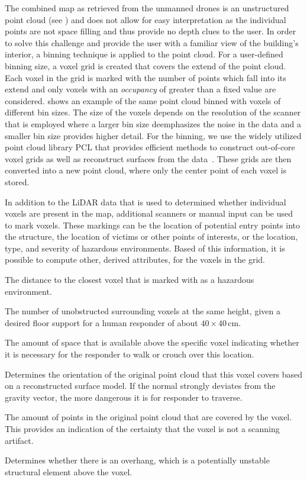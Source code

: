 The combined map as retrieved from the unmanned drones is an unstructured point cloud (see ) and does not allow for easy interpretation as the individual points are not space filling and thus provide no depth clues to the user.  In order to solve this challenge and provide the user with a familiar view of the building's interior, a binning technique is applied to the point cloud.  For a user-defined binning size, a voxel grid is created that covers the extend of the point cloud.  Each voxel in the grid is marked with the number of points which fall into its extend and only voxels with an \emph{occupancy} of greater than a fixed value are considered.   shows an example of the same point cloud binned with voxels of different bin sizes.  The size of the voxels depends on the resolution of the scanner that is employed where a larger bin size deemphasizes the noise in the data and a smaller bin size provides higher detail.  For the binning, we use the widely utilized point cloud library PCL that provides efficient methods to construct out-of-core voxel grids as well as reconstruct surfaces from the data~\cite{rusu20113d}.  These grids are then converted into a new point cloud, where only the center point of each voxel is stored.

In addition to the LiDAR data that is used to determined whether individual voxels are present in the map, additional scanners or manual input can be used to mark voxels.  These markings can be the location of potential entry points into the structure, the location of victims or other points of interests, or the location, type, and severity of hazardous environments.  Based of this information, it is possible to compute other, derived attributes, for the voxels in the grid.

\begin{description}[leftmargin=6em,style=nextline]
  \item[Hazard]    The distance to the closest voxel that is marked with as a hazardous environment.
  \item[Support]   The number of unobstructed surrounding voxels at the same height, given a desired floor support for a human responder of about $40\times40\,$cm.
  \item[Size]      The amount of space that is available above the specific voxel indicating whether it is necessary for the responder to walk or crouch over this location.
  \item[Normal]    Determines the orientation of the original point cloud that this voxel covers based on a reconstructed surface model.  If the normal strongly deviates from the gravity vector, the more dangerous it is for responder to traverse.
  \item[Occupancy] The amount of points in the original point cloud that are covered by the voxel.  This provides an indication of the certainty that the voxel is not a scanning artifact.
  \item[Overhang]  Determines whether there is an overhang, which is a potentially unstable structural element above the voxel.
\end{description}


